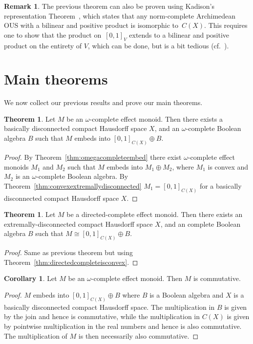 \documentclass[10pt,conference]{IEEEtran}
\newcounter{counter}
\theoremstyle{definition}
\newtheorem{theorem}[counter]{Theorem}
\newtheorem{corollary}[counter]{Corollary}
\newtheorem{remark}[counter]{Remark}
\begin{document}
\begin{remark}%
The previous theorem can also be proven
    using Kadison's representation Theorem~\cite{kadison1951representation},
    which states that any norm-complete Archimedean OUS
    with a bilinear and positive product
    is isomorphic to~$C(X)$.
This requires one to show that the product on~$[0,1]_V$
    extends to a bilinear and positive product on the entirety of $V$,
    which can be done,
    but is a bit tedious (cf.~\cite[Theorem 46]{basmaster}).
\end{remark}

\section{Main theorems}\label{sec:maintheorems}

We now collect our previous results and prove our main theorems.

\begin{theorem}\label{thm:omega-complete-classification}
    Let $M$ be an $\omega$-complete effect monoid.
    Then there exists a basically disconnected compact Hausdorff space $X$,
    and an $\omega$-complete Boolean algebra $B$ such that 
    $M$ embeds into $[0,1]_{C(X)} \oplus B$.
\end{theorem}
\begin{proof}
    By Theorem~\ref{thm:omegacompleteembed} there exist
    $\omega$-complete effect monoids $M_1$ and $M_2$
    such that $M$ embeds into $M_1\oplus M_2$, where $M_1$ is convex and 
    $M_2$ is an $\omega$-complete Boolean algebra.
    By Theorem~\ref{thm:convexextremallydisconnected} $M_1=[0,1]_{C(X)}$
    for a basically disconnected compact Hausdorff space $X$.
\end{proof}

\begin{theorem}\label{mainthmdirectedcomplete}
    Let $M$ be a directed-complete effect monoid.
    Then there exists an extremally-disconnected compact Hausdorff space $X$,
    and an complete Boolean algebra $B$ such that 
    $M\cong [0,1]_{C(X)} \oplus B$.
\end{theorem}
\begin{proof}
    Same as previous theorem but using Theorem~\ref{thm:directedcompleteisconvex}.
\end{proof}

\begin{corollary}
	Let $M$ be an $\omega$-complete effect monoid. Then $M$ is commutative.
\end{corollary}
\begin{proof}
	$M$ embeds into $[0,1]_{C(X)}\oplus B$ where $B$ is a Boolean algebra and $X$ is a basically disconnected compact Hausdorff space. The multiplication in $B$ is given by the join and hence is commutative, while the multiplication in $C(X)$ is given by pointwise multiplication in the real numbers and hence is also commutative. The multiplication of $M$ is then necessarily also commutative.
\end{proof}
\end{document}
